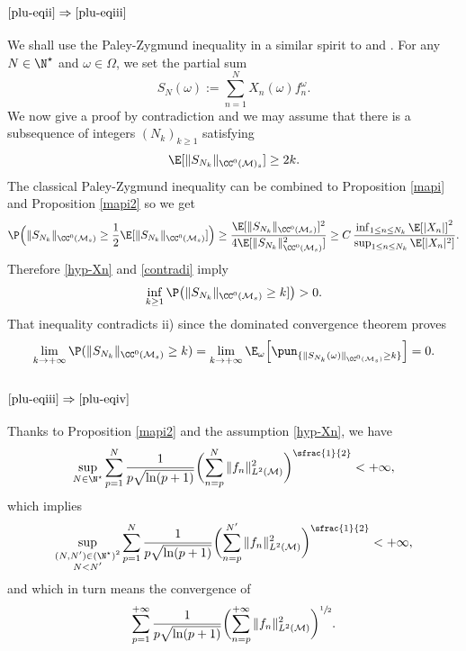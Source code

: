 \subsubsection*{$\eqref{plu-eqii}\Rightarrow\eqref{plu-eqiii}$}
We shall use the Paley-Zygmund inequality in a similar spirit to
\cite[p.\,55, Lem.\,1.2]{pisier1981} and \cite[Prop.\,2.17]{imek-crusep}. For any $N\in \N^\star$ and $\omega\in \Omega$, we set the partial sum
\begin{equation*}
S_N(\omega):=\sum_{n=1}^N X_n(\omega) f_n^{\omega}.
\end{equation*}
We now give a proof by contradiction and we may assume that there is a subsequence of integers $(N_k)_{k\geq 1}$ satisfying
\begin{equation}\label{contradi}
\E[\|S_{N_k}\|_{\CC^0(\mathcal{M})_s}]\geq 2k.
\end{equation}
The classical Paley-Zygmund inequality \cite[p.\,8, Ineq.\,II]{kahane} can be combined to Proposition \ref{mapi} and Proposition \ref{mapi2} so we get
\begin{equation*}
\P\Big(\|S_{N_k}\|_{\CC^0(\mathcal{M}_s)} \geq \frac{1}{2} \E[\|S_{N_k}\|_{\CC^0(\mathcal{M}_s)}]\Big)\geq \frac{\E[\|S_{N_k}\|_{\CC^0(\mathcal{M}_s)}]^2}{4
\E[\|S_{N_k}\|_{\CC^0(\mathcal{M}_s)}^2]} \geq C\,\frac{\inf_{1\leq n\leq N_k}\E[|X_n|]^2}{\sup_{1\leq n \leq N_k} \E[|X_n|^2] }.
\end{equation*}
Therefore \eqref{hyp-Xn} and \eqref{contradi} imply
\begin{equation*}
\inf_{k\geq 1} \P\bigl(\|S_{N_k}\|_{\CC^0(\mathcal{M}_s)} \geq k]\bigr)>0.
\end{equation*}
That inequality contradicts ii) since the dominated convergence theorem proves
\begin{equation*}
\lim_{k\to +\infty} \P(\|S_{N_k} \|_{\CC^0(\mathcal{M}_s)}\geq k)=\lim_{k\to +\infty} \E_{\omega}\Big[\pun_{\{\|S_{N_k}(\omega) \|_{\CC^0(\mathcal{M}_s)}\geq k\}}\Big]=0.
\end{equation*}

\subsubsection*{$\eqref{plu-eqiii}\Rightarrow\eqref{plu-eqiv}$}
Thanks to Proposition \ref{mapi2} and the assumption \eqref{hyp-Xn}, we have
\begin{equation*}
\sup_{N\in \N^\star} \sum_{p=1}^N \frac{1}{p\sqrt{\ln(p+1)}} \biggl(\sum_{n=p}^{N} \|f_n\|_{L^2(\mathcal{M})}^2 \biggr)^{\sfrac{1}{2}}<+\infty,
\end{equation*}
which implies
\begin{equation*}
\sup_{\substack{(N,N')\in (\N^\star)^2 \\ N<N' }} \sum_{p=1}^{N} \frac{1}{p\sqrt{\ln(p+1)}} \biggl(\sum_{n=p}^{N'} \|f_n\|_{L^2(\mathcal{M})}^2 \biggr)^{\sfrac{1}{2}} <+\infty,
\end{equation*}
and which in turn means the convergence of
\[
\sum_{p=1}^{+\infty} \frac{1}{p\sqrt{\ln(p+1)}} \biggl(\sum_{n=p}^{+\infty} \|f_n\|_{L^2(\mathcal{M})}^2 \biggr)^{\sfrac{1}{2}}.
\]

